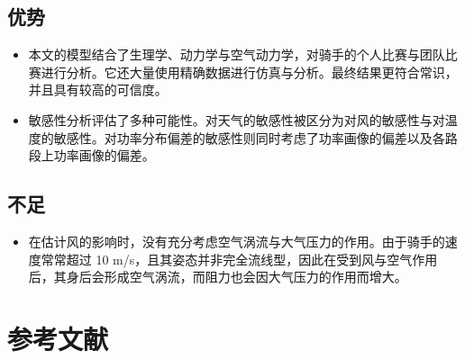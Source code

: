 \documentclass[11pt,a4paper]{ctexart}
\begin{document}
\subsection{优势}

\begin{itemize}
\item 本文的模型结合了生理学、动力学与空气动力学，对骑手的个人比赛与团队比赛进行分析。它还大量使用精确数据进行仿真与分析。最终结果更符合常识，并且具有较高的可信度。
\item 敏感性分析评估了多种可能性。对天气的敏感性被区分为对风的敏感性与对温度的敏感性。对功率分布偏差的敏感性则同时考虑了功率画像的偏差以及各路段上功率画像的偏差。
\end{itemize}

\subsection{不足}

\begin{itemize}
\item 在估计风的影响时，没有充分考虑空气涡流与大气压力的作用。由于骑手的速度常常超过 10 m/s，且其姿态并非完全流线型，因此在受到风与空气作用后，其身后会形成空气涡流，而阻力也会因大气压力的作用而增大。
\end{itemize}

\section*{参考文献}
\end{document}
